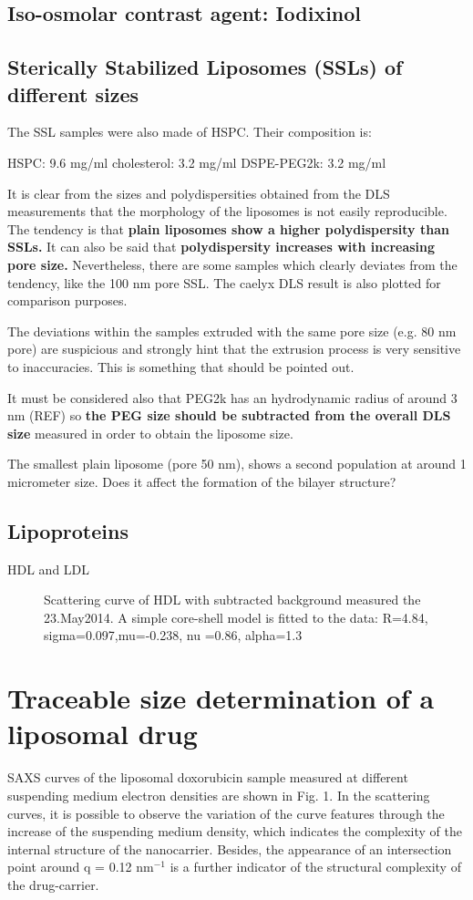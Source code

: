 \subsection{Iso-osmolar contrast agent: Iodixinol}
\subsection{Sterically Stabilized Liposomes (SSLs) of different sizes}

The SSL samples were also made of HSPC. Their composition is:

HSPC: 9.6 mg/ml
cholesterol: 3.2 mg/ml
DSPE-PEG2k: 3.2 mg/ml

It is clear from the sizes and polydispersities obtained from the DLS measurements that the morphology of the liposomes is not easily reproducible. The tendency is that \textbf{plain liposomes show a higher polydispersity than SSLs.} It can also be said that \textbf{polydispersity increases with increasing pore size.} Nevertheless, there are some samples which clearly deviates from the tendency, like the 100 nm pore SSL. The caelyx DLS result is also plotted for comparison purposes.

The deviations within the samples extruded with the same pore size (e.g. 80 nm pore) are suspicious and strongly hint that the extrusion process is very sensitive to inaccuracies. This is something that should be pointed out.

It must be considered also that PEG2k has an hydrodynamic radius of around 3 nm (REF) so \textbf{the PEG size should be subtracted from the overall DLS size} measured in order to obtain the liposome size.

The smallest plain liposome (pore 50 nm), shows a second population at around 1 micrometer size. Does it affect the formation of the bilayer structure?
\subsection{Lipoproteins}
HDL and LDL
\begin{figure}
	\centering
		
		\caption{Scattering curve of HDL with subtracted background measured the 23.May2014. A simple core-shell model is fitted to the data: R=4.84, sigma=0.097,mu=-0.238, nu	=0.86, alpha=1.3}
		\label{fig:HDLCoreShellFit}
\end{figure}

\section{Traceable size determination of a liposomal drug}
SAXS curves of the liposomal doxorubicin sample measured at different suspending medium electron densities are shown in Fig. 1. In the scattering curves, it is possible to observe the variation of the curve features through the increase of the suspending medium density, which indicates the complexity of the internal structure of the nanocarrier. Besides, the appearance of an intersection point around q = 0.12 nm$^{-1}$ is a further indicator of the structural complexity of the drug-carrier.

